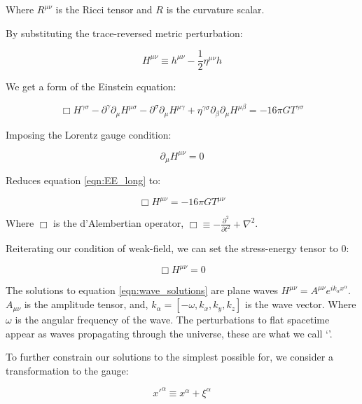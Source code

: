 Where $R^{\mu \nu}$ is the Ricci tensor and $R$ is the curvature scalar.

By substituting the trace-reversed metric perturbation:

\begin{equation}
   H^{\mu \nu} \equiv h^{\mu \nu} - \frac{1}{2} \eta^{\mu \nu} h
   \label{eqn:bigH}
\end{equation}

We get a form of the Einstein equation:

\begin{equation}
   \Box H^{\gamma \sigma} - \partial^\gamma \partial_\mu H^{\mu \sigma} - \partial^\sigma \partial_\mu H^{\mu \gamma}
   + \eta^{\gamma \sigma} \partial_\beta \partial_\mu H^{\mu \beta} = -16 \pi G T^{\gamma \sigma}
   \label{eqn:EE_long}
\end{equation}

Imposing the Lorentz gauge condition:

\begin{equation}
   \partial_\mu H^{\mu \nu} = 0
   \label{eqn:Lorentz_condition}
\end{equation}

Reduces equation \ref{eqn:EE_long} to:

\begin{equation}
   \Box H^{\mu \nu} = -16 \pi G T^{\mu \nu}
   \label{eqn:simple_EE}
\end{equation}

Where $\Box$ is the d'Alembertian operator, $\Box \equiv -\frac{\partial ^2}{\partial t^2} + \nabla^2$.

Reiterating our condition of weak-field, we can set the stress-energy tensor to 0:

\begin{equation}
   \Box H^{\mu \nu} = 0
   \label{eqn:wave_solutions}
\end{equation}

The solutions to equation \ref{eqn:wave_solutions} are plane waves
$H^{\mu \nu} = A^{\mu \nu} e^{i k_\alpha x^{\alpha}}$. $A_{\mu \nu}$ is the amplitude tensor, and, $k_\alpha = [-\omega, k_x, k_y, k_z]$ is the wave vector. Where $\omega$ is the angular frequency of the wave. The perturbations to flat spacetime appear as waves propagating through the universe, these are what we call `\gws'.

To further constrain our solutions to the simplest possible for, we consider a transformation to the gauge:

\begin{equation}
   x'^{\alpha} \equiv x^{\alpha} + \xi^{\alpha}
   \label{eqn:gauge_transformation}
\end{equation}

